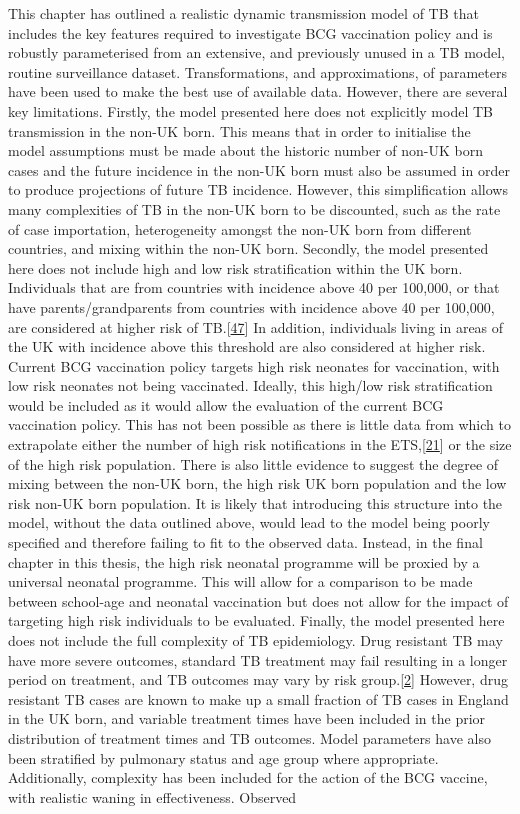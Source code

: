 \documentclass[11pt,twoside]{bristolthesis}
\begin{document}
  This chapter has outlined a realistic dynamic transmission model of TB that includes the key features required to investigate BCG vaccination policy and is robustly parameterised from an extensive, and previously unused in a TB model, routine surveillance dataset. Transformations, and approximations, of parameters have been used to make the best use of available data. However, there are several key limitations. Firstly, the model presented here does not explicitly model TB transmission in the non-UK born. This means that in order to initialise the model assumptions must be made about the historic number of non-UK born cases and the future incidence in the non-UK born must also be assumed in order to produce projections of future TB incidence. However, this simplification allows many complexities of TB in the non-UK born to be discounted, such as the rate of case importation, heterogeneity amongst the non-UK born from different countries, and mixing within the non-UK born. Secondly, the model presented here does not include high and low risk stratification within the UK born. Individuals that are from countries with incidence above 40 per 100,000, or that have parents/grandparents from countries with incidence above 40 per 100,000, are considered at higher risk of TB.{[}\protect\hyperlink{ref-PublicHealthEngland2011a}{47}{]} In addition, individuals living in areas of the UK with incidence above this threshold are also considered at higher risk. Current BCG vaccination policy targets high risk neonates for vaccination, with low risk neonates not being vaccinated. Ideally, this high/low risk stratification would be included as it would allow the evaluation of the current BCG vaccination policy. This has not been possible as there is little data from which to extrapolate either the number of high risk notifications in the ETS,{[}\protect\hyperlink{ref-PHE2018}{21}{]} or the size of the high risk population. There is also little evidence to suggest the degree of mixing between the non-UK born, the high risk UK born population and the low risk non-UK born population. It is likely that introducing this structure into the model, without the data outlined above, would lead to the model being poorly specified and therefore failing to fit to the observed data. Instead, in the final chapter in this thesis, the high risk neonatal programme will be proxied by a universal neonatal programme. This will allow for a comparison to be made between school-age and neonatal vaccination but does not allow for the impact of targeting high risk individuals to be evaluated. Finally, the model presented here does not include the full complexity of TB epidemiology. Drug resistant TB may have more severe outcomes, standard TB treatment may fail resulting in a longer period on treatment, and TB outcomes may vary by risk group.{[}\protect\hyperlink{ref-PHE2017}{2}{]} However, drug resistant TB cases are known to make up a small fraction of TB cases in England in the UK born, and variable treatment times have been included in the prior distribution of treatment times and TB outcomes. Model parameters have also been stratified by pulmonary status and age group where appropriate. Additionally, complexity has been included for the action of the BCG vaccine, with realistic waning in effectiveness. Observed 
\end{document}
